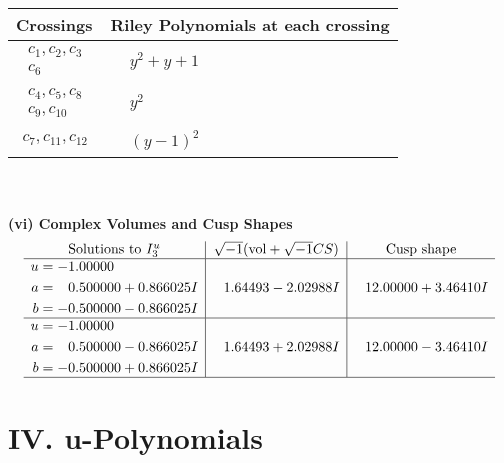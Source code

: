 \documentclass[1p]{elsarticle_modified}
\theoremstyle{definition}
\newcommand{\I}{\sqrt{-1}}
\begin{document}
\begin{tabular}{m{50pt}|m{274pt}}
Crossings & \hspace{64pt}Riley Polynomials at each crossing \\
\hline $$\begin{aligned}c_{1},c_{2},c_{3}\\c_{6}\end{aligned}$$&$\begin{aligned}
&y^2+y+1
\end{aligned}$\\
\hline $$\begin{aligned}c_{4},c_{5},c_{8}\\c_{9},c_{10}\end{aligned}$$&$\begin{aligned}
&y^2
\end{aligned}$\\
\hline $$\begin{aligned}c_{7},c_{11},c_{12}\end{aligned}$$&$\begin{aligned}
&(y-1)^2
\end{aligned}$\\
\hline
\end{tabular}\\~\\
\newpage\flushleft \textbf{(vi) Complex Volumes and Cusp Shapes}
$$\begin{array}{c|c|c}  
\text{Solutions to }I^u_{3}& \I (\text{vol} + \sqrt{-1}CS) & \text{Cusp shape}\\
 \hline 
\begin{aligned}
u &= -1.00000\phantom{ +0.000000I} \\
a &= \phantom{-}0.500000 + 0.866025 I \\
b &= -0.500000 - 0.866025 I\end{aligned}
 & \phantom{-}1.64493 - 2.02988 I & \phantom{-}12.00000 + 3.46410 I \\ \hline\begin{aligned}
u &= -1.00000\phantom{ +0.000000I} \\
a &= \phantom{-}0.500000 - 0.866025 I \\
b &= -0.500000 + 0.866025 I\end{aligned}
 & \phantom{-}1.64493 + 2.02988 I & \phantom{-}12.00000 - 3.46410 I\\
 \hline 
 \end{array}$$\newpage
\newpage\renewcommand{\arraystretch}{1}
\centering \section*{ IV. u-Polynomials}
\end{document}
